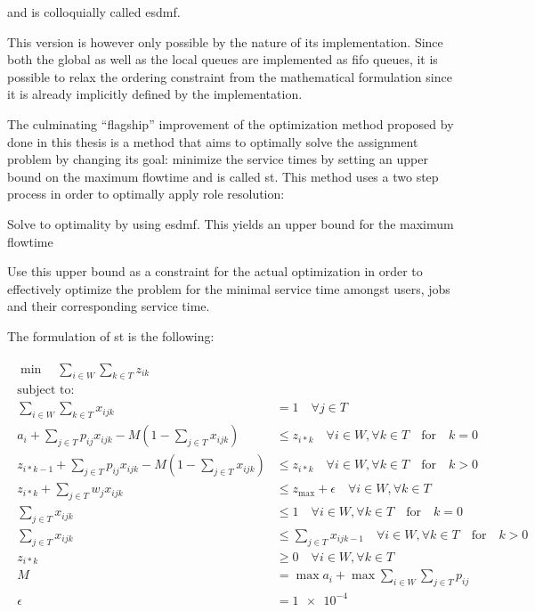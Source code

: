 and is colloquially called \gls{esdmf}.

This version is however only possible by the nature of its implementation. Since both the global as well as the local queues are implemented as \gls{fifo} queues, it is possible to relax the ordering constraint from the mathematical formulation since it is already implicitly defined by the implementation.

The culminating ``flagship'' improvement of the optimization method proposed by \citet{Zeng2005} done in this thesis is a method that aims to optimally solve the assignment problem by changing its goal: minimize the service times by setting an upper bound on the maximum flowtime and is called \gls{st}. This method uses a two step process in order to optimally apply role resolution:
\begin{enumerate*}
	\item Solve to optimality by using \gls{esdmf}. This yields an upper bound for the maximum flowtime
	\item Use this upper bound as a constraint for the actual optimization in order to effectively optimize the problem for the minimal service time amongst users, jobs and their corresponding service time.
\end{enumerate*}

The formulation of \gls{st} is the following:

\begin{align}
	\begin{split}
	    \min \quad \sum_{i \in W} \sum_{k \in T} z_{ik}\\
	    \text{subject to:} \\
	    \sum_{i \in W} \sum_{k \in T} x_{ijk} &= 1 \quad \forall j \in T\\
	    a_i + \sum_{j \in T} p_{ij} x_{ijk} - M(1 - \sum_{j \in T} x_{ijk}) &\leq z_{i*k} \quad \forall i \in W, \forall k \in T \quad \text{for} \quad k=0\\
	    z_{i*k-1} + \sum_{j \in T} p_{ij} x_{ijk} - M(1 - \sum_{j \in T} x_{ijk}) &\leq z_{i*k} \quad \forall i \in W, \forall k \in T \quad \text{for} \quad k>0\\
	    z_{i*k}+ \sum_{j \in T} w_j x_{ijk} &\leq z_{\text{max}} + \epsilon \quad \forall i \in W, \forall k \in T\\
	    \sum_{j \in T} x_{ijk} &\leq 1 \quad \forall i \in W, \forall k \in T \quad \text{for} \quad k=0\\
	    \sum_{j \in T} x_{ijk} &\leq \sum_{j \in T} x_{ijk-1} \quad \forall i \in W, \forall k \in T \quad \text{for} \quad k>0\\
	    z_{i*k} &\geq 0 \quad \forall i \in W, \forall k \in T\\
	    M &= \max a_i + \max \sum_{i \in W} \sum_{j \in T} p_{ij}\\
	    \epsilon &= \num{1e-4}
	\end{split}
\end{align}

